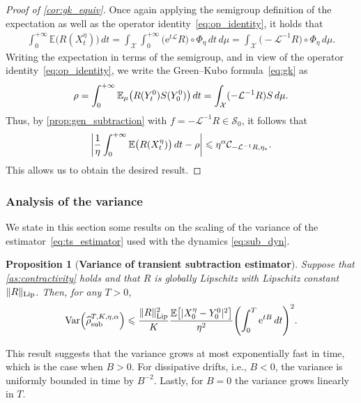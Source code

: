 \documentclass[11pt]{article}
\newcommand{\E}{\mathbb{E}}
\newcommand{\e}{\mathrm{e}}
\renewcommand{\L}{\mathcal{L}}
\renewcommand{\S}{\mathscr{S}}
\renewcommand{\leq}{\leqslant}
\DeclareMathOperator{\Var}{Var}
\DeclarePairedDelimiter\abs{\lvert}{\rvert}
\DeclarePairedDelimiter\paren{\lparen}{\rparen}
\DeclarePairedDelimiter\bkt{\lbrack}{\rbrack}
\newtheorem{proposition}{Proposition}
\theoremstyle{definition}
\newcommand{\RLip}{\|R\|_{\rm Lip}}
\newcommand{\estTmp}{\widehat{\rho}}
\newcommand{\aTSest}{\estTmp^{T,K,\eta,\alpha}_{\rm sub}} %
\begin{document}
\begin{proof}[Proof of \cref{cor:gk_equiv}]
Once again applying the semigroup definition of the expectation as well as the operator identity~\eqref{eq:op_identity}, it holds that
\begin{align}
		\int_0^{+\infty} \E\bigl(R(X^\eta_t)\bigr) \, dt = \int_\mathcal{X}\int_0^{+\infty} \bigl(\e^{t\L}R\bigr)\circ \Phi_\eta \, dt \, d\mu
= \int_\mathcal{X} \bigl(-\L^{-1}R\bigr)\circ \Phi_\eta \, d\mu.
		\label{eq:cor_Tint_to_LinvR}
	\end{align}
Writing the expectation in terms of the semigroup, and in view of the operator identity~\eqref{eq:op_identity}, we write the Green--Kubo formula~\eqref{eq:gk} as
\begin{align}
    \notag
		\rho = \int_0^{+\infty} \E_\mu\bigl(R(Y_t^0)S(Y_0^0)\bigr) \, dt = \int_\mathcal{X} (-\L^{-1}R)S \, d\mu.
	\end{align}
Thus, by \cref{prop:gen_subtraction} with $f = -\L^{-1}R \in \S_0$, it follows that
\begin{equation}
		\abs*{\frac{1}{\eta}\int_0^{+\infty} \E\bigl(R(X^\eta_t)\bigr) \, dt - \rho} \leq \eta^{\alpha} \mathcal{C}_{-\L^{-1}R,\eta_*}.
		\label{eq:cor_eta_bias}
	\end{equation}
This allows us to obtain the desired result.
\end{proof}

\subsubsection{Analysis of the variance}
\label{subsubsec:variance_analysis}
We state in this section some results on the scaling of the variance of the estimator~\eqref{eq:ts_estimator} used with the dynamics \eqref{eq:sub_dyn}.

\begin{proposition}[{\bf Variance of transient subtraction estimator}]
	\label{prop:var_ts}
	Suppose that \cref{as:contractivity} holds and that $R$ is globally Lipschitz with Lipschitz constant $\RLip$. Then, for any $T>0$,
\begin{equation}
		\Var\paren*{\aTSest} \leq \frac{\RLip^2}{K}\frac{\E\bkt*{|X_0^\eta - Y_0^0|^2}}{\eta^2}\paren*{\int_0^T \e^{tB} \, dt}^2.
\label{eq:var_prop_bound}
	\end{equation}
\end{proposition}
This result suggests that the variance grows at most exponentially fast in time, which is the case when $B>0$. For dissipative drifts, i.e., $B<0$, the variance is uniformly bounded in time by $B^{-2}$. Lastly, for $B=0$ the variance grows linearly in $T$.
\end{document}

